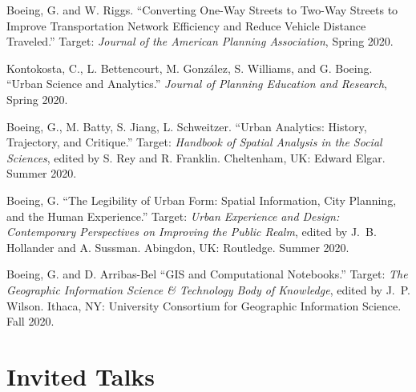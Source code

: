 \documentclass[12pt,letterpaper]{report}
\begin{document}
    \begin{tablist}
        
        \item[\the\year] \tab Boeing, G. and W. Riggs. \enquote{Converting One-Way Streets to Two-Way Streets to Improve Transportation Network Efficiency and Reduce Vehicle Distance Traveled.} Target: \textit{Journal of the American Planning Association}, Spring 2020.
        
        \item[\the\year] \tab Kontokosta, C., L. Bettencourt, M. González, S. Williams, and G. Boeing. \enquote{Urban Science and Analytics.} \textit{Journal of Planning Education and Research}, Spring 2020.

        \item[\the\year] \tab Boeing, G., M. Batty, S. Jiang, L. Schweitzer. \enquote{Urban Analytics: History, Trajectory, and Critique.} Target: \textit{Handbook of Spatial Analysis in the Social Sciences}, edited by S. Rey and R. Franklin. Cheltenham, UK: Edward Elgar. Summer 2020.
        
        \item[\the\year] \tab Boeing, G. \enquote{The Legibility of Urban Form: Spatial Information, City Planning, and the Human Experience.} Target: \textit{Urban Experience and Design: Contemporary Perspectives on Improving the Public Realm}, edited by J.~B. Hollander and A. Sussman. Abingdon, UK: Routledge. Summer 2020.
        
        \item[\the\year] \tab Boeing, G. and D. Arribas-Bel \enquote{GIS and Computational Notebooks.} Target: \textit{The Geographic Information Science \& Technology Body of Knowledge}, edited by J.~P. Wilson. Ithaca, NY: University Consortium for Geographic Information Science. Fall 2020.

    \end{tablist}



    \section*{Invited Talks}
\end{document}
